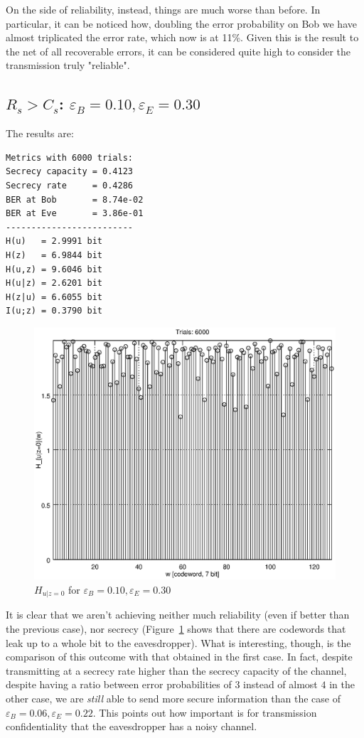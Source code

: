 \documentclass[a4paper,12pt,titlepage]{article}
\begin{document}
On the side of reliability, instead, things are much worse than before. In
particular, it can be noticed how, doubling the error probability on Bob we
have almost triplicated the error rate, which now is at 11\%. Given this is the
result to the net of all recoverable errors, it can be considered quite high to
consider the transmission truly "reliable".

\subsection*{$R_s > C_s$: $\varepsilon_B = 0.10, \varepsilon_E = 0.30$}
The results are:
\begin{verbatim}
Metrics with 6000 trials:
Secrecy capacity = 0.4123
Secrecy rate     = 0.4286
BER at Bob       = 8.74e-02
BER at Eve       = 3.86e-01
-------------------------
H(u)   = 2.9991 bit
H(z)   = 6.9844 bit
H(u,z) = 9.6046 bit
H(u|z) = 2.6201 bit
H(z|u) = 6.6055 bit
I(u;z) = 0.3790 bit
\end{verbatim}

\begin{figure}[h]
  \centering
  \includegraphics[scale=0.8]{bsc__0_100_0_300__6000.eps}
  \caption{$H_{u|z=0}$ for $\varepsilon_B = 0.10, \varepsilon_E = 0.30$}
  \label{fig:bsc_0.10_0.30}
\end{figure}

It is clear that we aren't achieving neither much reliability (even if better
than the previous case), nor secrecy (Figure~\ref{fig:bsc_0.10_0.30} shows that
there are codewords that leak up to a whole bit to the eavesdropper). What is
interesting, though, is the comparison of this outcome with that obtained in
the first case. In fact, despite transmitting at a secrecy rate higher than the
secrecy capacity of the channel, despite having a ratio between error
probabilities of $3$ instead of almost $4$ in the other case, we are
\emph{still} able to send more secure information than the case of
$\varepsilon_B = 0.06, \varepsilon_E = 0.22$. This points out how important is
for transmission confidentiality that the eavesdropper has a noisy channel.
\end{document}
